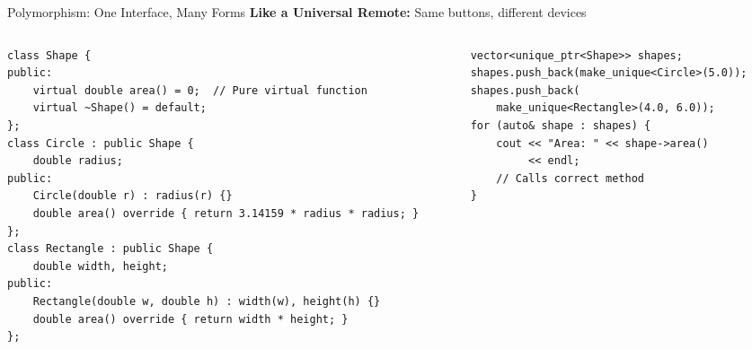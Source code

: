 \begin{frame}[fragile]{Polymorphism: One Interface, Many Forms}
	\textbf{Like a Universal Remote:} Same buttons, different devices

	\begin{columns}
		\begin{column}{0.6\textwidth}
			\begin{verbatim}
class Shape {
public:
    virtual double area() = 0;  // Pure virtual function
    virtual ~Shape() = default;
};
class Circle : public Shape {
    double radius;
public:
    Circle(double r) : radius(r) {}
    double area() override { return 3.14159 * radius * radius; }
};
class Rectangle : public Shape {
    double width, height;
public:
    Rectangle(double w, double h) : width(w), height(h) {}
    double area() override { return width * height; }
};
    \end{verbatim}
		\end{column}
		\begin{column}{0.4\textwidth}

			\begin{verbatim}
vector<unique_ptr<Shape>> shapes;
shapes.push_back(make_unique<Circle>(5.0));
shapes.push_back(
    make_unique<Rectangle>(4.0, 6.0));
for (auto& shape : shapes) {
    cout << "Area: " << shape->area()
         << endl;
    // Calls correct method
}
    \end{verbatim}
		\end{column}
	\end{columns}
\end{frame}

